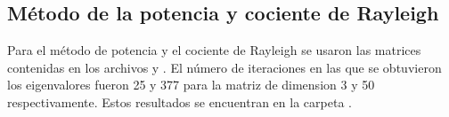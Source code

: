 \subsection{Método de la potencia y cociente de Rayleigh}

Para el método de potencia y el cociente de Rayleigh se usaron las matrices contenidas en los archivos  y . El número de iteraciones en las que se obtuvieron los eigenvalores fueron 25 y 377 para la matriz de dimension 3 y 50 respectivamente. Estos resultados se encuentran en la carpeta .